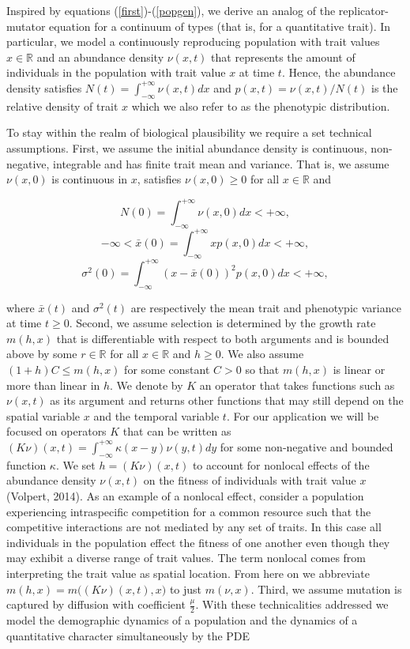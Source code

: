 \documentclass[]{elsarticle} %
\begin{document}
Inspired by equations (\ref{first})-(\ref{popgen}), we derive an analog
of the replicator-mutator equation for a continuum of types (that is,
for a quantitative trait). In particular, we model a continuously
reproducing population with trait values \(x\in\mathbb{R}\) and an
abundance density \(\nu(x,t)\) that represents the amount of individuals
in the population with trait value \(x\) at time \(t\). Hence, the
abundance density satisfies \(N(t)=\int_{-\infty}^{+\infty}\nu(x,t)dx\)
and \(p(x,t)=\nu(x,t)/N(t)\) is the relative density of trait \(x\)
which we also refer to as the phenotypic distribution.

To stay within the realm of biological plausibility we require a set
technical assumptions. First, we assume the initial abundance density is
continuous, non-negative, integrable and has finite trait mean and
variance. That is, we assume \(\nu(x,0)\) is continuous in \(x\),
satisfies \(\nu(x,0)\geq0\) for all \(x\in\mathbb{R}\) and

\begin{equation}
N(0)=\int_{-\infty}^{+\infty}\nu(x,0)dx<+\infty,
\end{equation} \begin{equation}
-\infty<\bar x(0)=\int_{-\infty}^{+\infty}xp(x,0)dx<+\infty,
\end{equation} \begin{equation}
\sigma^2(0)=\int_{-\infty}^{+\infty}(x-\bar x(0))^2p(x,0)dx<+\infty,
\end{equation}

where \(\bar x(t)\) and \(\sigma^2(t)\) are respectively the mean trait
and phenotypic variance at time \(t\geq0\). Second, we assume selection
is determined by the growth rate \(m(h,x)\) that is differentiable with
respect to both arguments and is bounded above by some
\(r\in\mathbb{R}\) for all \(x\in\mathbb{R}\) and \(h\geq0\). We also
assume \((1+h)C\leq m(h,x)\) for some constant \(C>0\) so that
\(m(h,x)\) is linear or more than linear in \(h\). We denote by \(K\) an
operator that takes functions such as \(\nu(x,t)\) as its argument and
returns other functions that may still depend on the spatial variable
\(x\) and the temporal variable \(t\). For our application we will be
focused on operators \(K\) that can be written as
\((K\nu)(x,t)=\int_{-\infty}^{+\infty}\kappa(x-y)\nu(y,t)dy\) for some
non-negative and bounded function \(\kappa\). We set \(h=(K\nu)(x,t)\)
to account for nonlocal effects of the abundance density \(\nu(x,t)\) on
the fitness of individuals with trait value \(x\) (Volpert, 2014). As an
example of a nonlocal effect, consider a population experiencing
intraspecific competition for a common resource such that the
competitive interactions are not mediated by any set of traits. In this
case all individuals in the population effect the fitness of one another
even though they may exhibit a diverse range of trait values. The term
nonlocal comes from interpreting the trait value as spatial location.
From here on we abbreviate \(m(h,x)=m\big((K\nu)(x,t),x\big)\) to just
\(m(\nu,x)\). Third, we assume mutation is captured by diffusion with
coefficient \(\frac{\mu}{2}\). With these technicalities addressed we
model the demographic dynamics of a population and the dynamics of a
quantitative character simultaneously by the PDE
\end{document}
